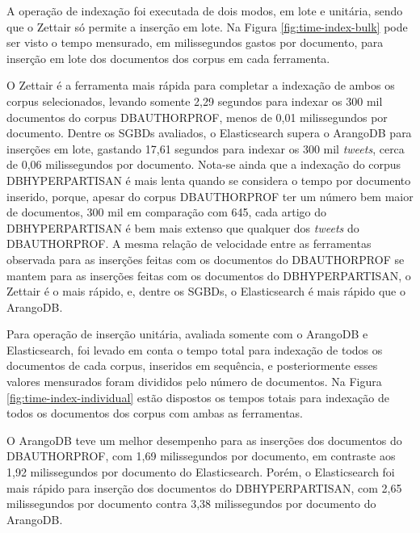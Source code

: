 			A operação de indexação foi executada de dois modos, em lote e unitária, sendo que o Zettair só permite a inserção em lote. 
			Na Figura \ref{fig:time-index-bulk} pode ser visto o tempo mensurado, em milissegundos gastos por documento, para inserção em lote dos documentos dos corpus em cada ferramenta.

			

			O Zettair é a ferramenta mais rápida para completar a indexação de ambos os corpus selecionados, levando somente 2,29 segundos para indexar os 300 mil documentos do corpus DB\underscore{}AUTHORPROF, menos de 0,01 milissegundos por documento.
			Dentre os SGBDs avaliados, o Elasticsearch supera o ArangoDB para inserções em lote, gastando 17,61 segundos para indexar os 300 mil \textit{tweets}, cerca de 0,06 milissegundos por documento.
			Nota-se ainda que a indexação do corpus DB\underscore{}HYPERPARTISAN é mais lenta quando se considera o tempo por documento inserido, porque, apesar do corpus DB\underscore{}AUTHORPROF ter um número bem maior de documentos, 300 mil em comparação com 645, cada artigo do DB\underscore{}HYPERPARTISAN é bem mais extenso que qualquer dos \textit{tweets} do DB\underscore{}AUTHORPROF.
			A mesma relação de velocidade entre as ferramentas observada para as inserções feitas com os documentos do DB\underscore{}AUTHORPROF se mantem para as inserções feitas com os documentos do DB\underscore{}HYPERPARTISAN, o Zettair é o mais rápido, e, dentre os SGBDs, o Elasticsearch é mais rápido que o ArangoDB.
			
			Para operação de inserção unitária, avaliada somente com o ArangoDB e Elasticsearch, foi levado em conta o tempo total para indexação de todos os documentos de cada corpus, inseridos em sequência, e posteriormente esses valores mensurados foram divididos pelo número de documentos.
			Na Figura \ref{fig:time-index-individual} estão dispostos os tempos totais para indexação de todos os documentos dos corpus com ambas as ferramentas. 

			

			O ArangoDB teve um melhor desempenho para as inserções dos documentos do DB\underscore{}AUTHORPROF, com 1,69 milissegundos por documento, em contraste aos 1,92 milissegundos por documento do Elasticsearch.
			Porém, o Elasticsearch foi mais rápido para inserção dos documentos do DB\underscore{}HYPERPARTISAN, com 2,65 milissegundos por documento contra 3,38 milissegundos por documento do ArangoDB.		

